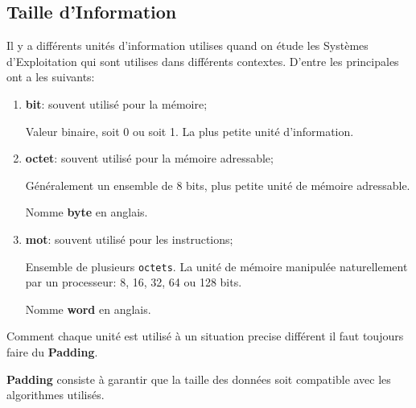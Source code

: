 \documentclass{article}
\begin{document}
\subsection{Taille d'Information}
Il y a différents unités d'information utilises quand on étude les Systèmes d'Exploitation qui sont utilises dans différents contextes. D'entre les principales ont a les suivants:
\begin{enumerate}[rightmargin = \leftmargin]
    \item \textbf{bit}: souvent utilisé pour la mémoire;
    \begin{definition}\label{def:bit}
        Valeur binaire, soit 0 ou soit 1. La plus petite unité d'information.
    \end{definition}

    \item \textbf{octet}: souvent utilisé pour la mémoire adressable;
    \begin{definition}\label{def:octet}
        Généralement un ensemble de 8 bits, plus petite unité de mémoire adressable.
        
        \begin{remark}
            Nomme \textbf{byte} en anglais.
        \end{remark}
    \end{definition}

    \item \textbf{mot}: souvent utilisé pour les instructions; 
    \begin{definition}\label{def:mot}
        Ensemble de plusieurs \texttt{octets}. La unité de mémoire manipulée naturellement par un processeur: 8, 16, 32, 64 ou 128 bits.
    
        \begin{remark}
            Nomme \textbf{word} en anglais.
        \end{remark}
    \end{definition}
\end{enumerate}
Comment chaque unité est utilisé à un situation precise différent il faut toujours faire du \textbf{Padding}.
\begin{definition}\label{def:padding}
    \textbf{Padding} consiste à garantir que la taille des données soit compatible avec les algorithmes utilisés.
\end{definition}
\end{document}
